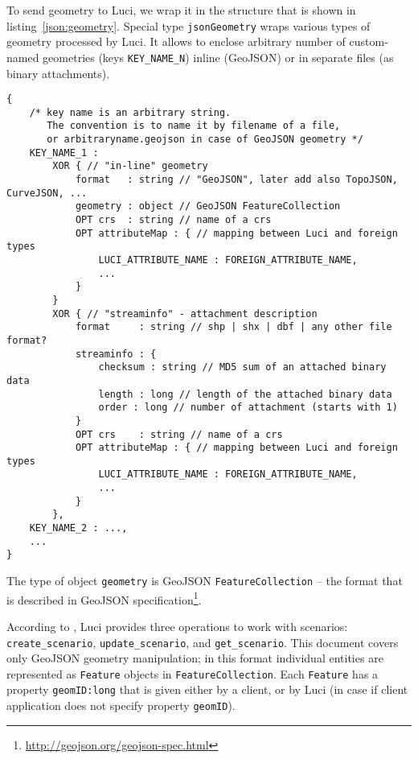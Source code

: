 \documentclass[pdftex,11pt,a4paper]{article} %
\newcommand{\comment}[1]{{\color{red} #1 }}
\begin{document}
To send geometry to \ac{Luci}, we wrap it in the structure that is shown in listing~\ref{json:geometry}.
Special type \texttt{\color{blue}jsonGeometry} wraps various types of geometry processed by \ac{Luci}.
It allows to enclose arbitrary number of custom-named geometries (keys \texttt{KEY\_NAME\_N}) inline (GeoJSON) or in separate files (as binary attachments).
%
\begin{lstlisting}[caption={structure of \texttt{\color{blue}jsonGeometry} data type}, label={json:geometry}]
{
	/* key name is an arbitrary string.
	   The convention is to name it by filename of a file,
	   or arbitraryname.geojson in case of GeoJSON geometry */
	KEY_NAME_1 :
		XOR { // "in-line" geometry
			format   : string // "GeoJSON", later add also TopoJSON, CurveJSON, ...
			geometry : object // GeoJSON FeatureCollection
			OPT crs  : string // name of a crs
			OPT attributeMap : { // mapping between Luci and foreign types
				LUCI_ATTRIBUTE_NAME : FOREIGN_ATTRIBUTE_NAME,
				...
			}
		}
		XOR { // "streaminfo" - attachment description
			format     : string // shp | shx | dbf | any other file format?
			streaminfo : {
				checksum : string // MD5 sum of an attached binary data
				length : long // length of the attached binary data
				order : long // number of attachment (starts with 1)
			}
			OPT crs    : string // name of a crs
			OPT attributeMap : { // mapping between Luci and foreign types
				LUCI_ATTRIBUTE_NAME : FOREIGN_ATTRIBUTE_NAME,
				...
			}
		},
	KEY_NAME_2 : ...,
	...
}
\end{lstlisting}
%
The type of object \texttt{geometry} is GeoJSON \texttt{FeatureCollection} -- the format that is described in GeoJSON specification\footnote{\url{http://geojson.org/geojson-spec.html}}.



According to ,
\ac{Luci} provides three operations to work with scenarios:
\texttt{create\_scenario}, \texttt{update\_scenario}, and \texttt{get\_scenario}.
This document covers only GeoJSON geometry manipulation;
in this format individual entities are represented as \texttt{Feature} objects in \texttt{FeatureCollection}.
Each \texttt{Feature} has a property \texttt{geomID:\color{blue}long} that is given either by a client, or by \ac{Luci} (in case if client application does not specify property \texttt{geomID}).
\end{document}
